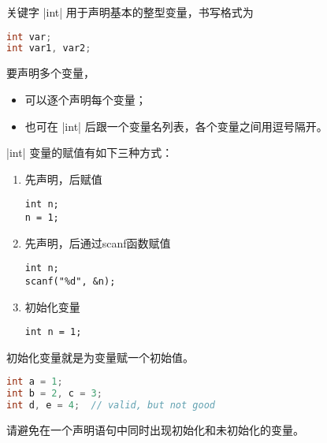 \begin{frame}[fragile]
关键字 \lst|int| 用于声明基本的整型变量，书写格式为
\begin{lstlisting}[language=c,backgroundcolor=\color{red!10}]
int var;
int var1, var2;
\end{lstlisting}  \vspace{0.05in}

要声明多个变量，\vspace{0.05in}
\begin{itemize}
\item 可以逐个声明每个变量；\\[0.1in]
\item 也可在 \lst|int| 后跟一个变量名列表，各个变量之间用逗号隔开。
\end{itemize}

\end{frame}
\begin{frame}[fragile]
 \lst|int| 变量的赋值有如下三种方式：\vspace{0.05in}
\begin{enumerate}
\item 先声明，后赋值
\begin{lstlisting}
int n;
n = 1;
\end{lstlisting}
\item 先声明，后通过scanf函数赋值
\begin{lstlisting}
int n;
scanf("%d", &n);
\end{lstlisting} 
\item 初始化变量
\begin{lstlisting}
int n = 1;
\end{lstlisting} 
\end{enumerate}
\end{frame}
%
%
\begin{frame}[fragile]
初始化变量就是为变量赋一个初始值。
\begin{lstlisting}[language=c,backgroundcolor=\color{red!10}]
int a = 1;
int b = 2, c = 3;
int d, e = 4;  // valid, but not good
\end{lstlisting}
请避免在一个声明语句中同时出现初始化和未初始化的变量。
\end{frame}
%
